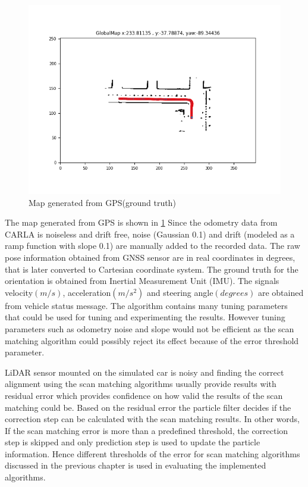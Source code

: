     \begin{figure}[h] 
        \includegraphics[height=0.6\textwidth]{images/GroundTruthMap.png}
        \caption{Map generated from GPS(ground truth)}
        \label{fig:GT_MAP}
    \end{figure}
The map generated from GPS is shown in \ref{fig:GT_MAP}
Since the odometry data from CARLA is noiseless and drift free, noise (Gaussian 0.1) and drift (modeled as a ramp function with slope 0.1) are manually added to the recorded data. The raw pose information obtained from GNSS sensor are in real coordinates in degrees, that is later converted to Cartesian coordinate system. The ground truth for the orientation is obtained from Inertial Measurement Unit (IMU). The signals velocity$(m/s)$, acceleration$(m/s^2)$ and steering angle$(degrees)$ are obtained from vehicle status message. The algorithm contains many tuning parameters that could be used for tuning and experimenting the results. However tuning parameters such as odometry noise and slope  would not be efficient as the scan matching algorithm could possibly reject its effect because of the error threshold parameter.
\clearpage
\par
LiDAR sensor mounted on the simulated car is noisy and finding the correct alignment using the scan matching algorithms usually provide results with residual error which provides confidence on how valid the results of the scan matching could be. Based on the residual error the particle filter decides if the correction step can be calculated with the scan matching results. In other words, If the scan matching error is more than a predefined threshold, the correction step is skipped and only prediction step is used to update the particle information.
Hence different thresholds of the error for scan matching algorithms discussed in the previous chapter is used in evaluating the implemented algorithms. 
